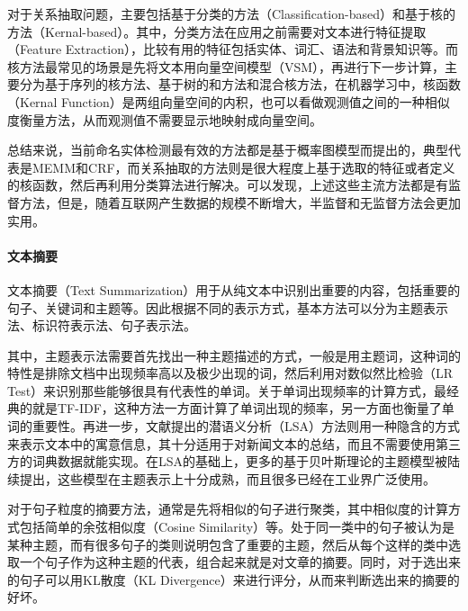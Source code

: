 对于关系抽取问题，主要包括基于分类的方法（Classification-based）\cite{kambhatla2004combining,guodong2005exploring,jiang2007systematic,chan2010exploiting}和基于核的方法（Kernal-based）\cite{bunescu2005shortest,zhao2005extracting}。其中，分类方法在应用之前需要对文本进行特征提取（Feature Extraction），比较有用的特征包括实体、词汇、语法和背景知识等。而核方法最常见的场景是先将文本用向量空间模型（VSM），再进行下一步计算，主要分为基于序列的核方法、基于树的和方法和混合核方法，在机器学习中，核函数（Kernal Function）是两组向量空间的内积，也可以看做观测值之间的一种相似度衡量方法，从而观测值不需要显示地映射成向量空间。

总结来说，当前命名实体检测最有效的方法都是基于概率图模型而提出的，典型代表是MEMM和CRF，而关系抽取的方法则是很大程度上基于选取的特征或者定义的核函数，然后再利用分类算法进行解决。可以发现，上述这些主流方法都是有监督方法，但是，随着互联网产生数据的规模不断增大，半监督和无监督方法会更加实用。

\paragraph{文本摘要}
文本摘要（Text Summarization）用于从纯文本中识别出重要的内容，包括重要的句子、关键词和主题等。因此根据不同的表示方式，基本方法可以分为主题表示法、标识符表示法、句子表示法。

其中，主题表示法需要首先找出一种主题描述的方式，一般是用主题词，这种词的特性是排除文档中出现频率高以及极少出现的词，然后利用对数似然比检验（LR Test）来识别那些能够很具有代表性的单词\cite{dunning1993accurate}。关于单词出现频率的计算方式，最经典的就是TF-IDF\cite{gupta2007measuring}，这种方法一方面计算了单词出现的频率，另一方面也衡量了单词的重要性。再进一步，文献\cite{deerwester1990indexing}提出的潜语义分析（LSA）方法则用一种隐含的方式来表示文本中的寓意信息，其十分适用于对新闻文本的总结，而且不需要使用第三方的词典数据就能实现。在LSA的基础上，更多的基于贝叶斯理论的主题模型被陆续提出，这些模型在主题表示上十分成熟，而且很多已经在工业界广泛使用\cite{daume2006bayesian,haghighi2009exploring,wang2009multi,celikyilmaz2010hybrid}。

对于句子粒度的摘要方法，通常是先将相似的句子进行聚类\cite{mckeown1999towards,hatzivassiloglou2001simfinder}，其中相似度的计算方式包括简单的余弦相似度（Cosine Similarity）等。处于同一类中的句子被认为是某种主题，而有很多句子的类则说明包含了重要的主题，然后从每个这样的类中选取一个句子作为这种主题的代表，组合起来就是对文章的摘要。同时，对于选出来的句子可以用KL散度（KL Divergence）来进行评分，从而来判断选出来的摘要的好坏。

